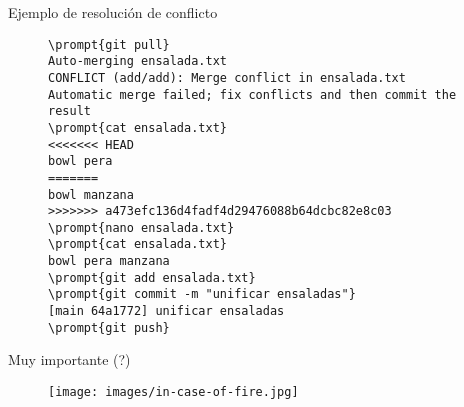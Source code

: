 \newcommand{\prompt}[1]{{\color{tangelo}\$} \textbf{#1}}
\begin{frame}[t, fragile=singleslide]{Ejemplo de resolución de conflicto}
    \begin{figure}[ht]
        \small
        \begin{Verbatim}[commandchars=\\\{\}]
\prompt{git pull}
Auto-merging ensalada.txt
CONFLICT (add/add): Merge conflict in ensalada.txt
Automatic merge failed; fix conflicts and then commit the result
\prompt{cat ensalada.txt}
<<<<<<< HEAD
bowl pera
=======
bowl manzana
>>>>>>> a473efc136d4fadf4d29476088b64dcbc82e8c03
\prompt{nano ensalada.txt}
\prompt{cat ensalada.txt}
bowl pera manzana
\prompt{git add ensalada.txt}
\prompt{git commit -m "unificar ensaladas"}
[main 64a1772] unificar ensaladas
\prompt{git push}
        \end{Verbatim}
    \end{figure}
\end{frame}

\begin{frame}[t]{Muy importante (?)}
    \begin{figure}[ht]
        \begin{center}
            \texttt{[image: images/in-case-of-fire.jpg]}
        \end{center}
    \end{figure}
\end{frame}
